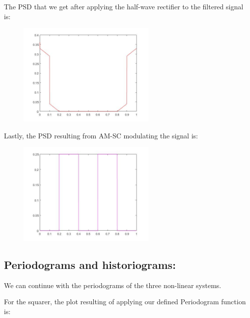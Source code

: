 \documentclass[a4paper,11pt]{article}
\begin{document}
\newpage

The PSD that we get after applying the half-wave rectifier to the filtered signal is:

\begin{figure}[!hp]
    \begin{center}
    \includegraphics[width=0.6\textwidth]{images/lab3_figure9_3.jpg}
    \end{center}
\end{figure}

Lastly, the PSD resulting from AM-SC modulating the signal is:

\begin{figure}[!hp]
    \begin{center}
    \includegraphics[width=0.6\textwidth]{images/lab3_figure9_4.jpg}
    \end{center}
\end{figure}

\newpage

\subsection{Periodograms and historiograms:}

We can continue with the periodograms of the three non-linear systems.

For the squarer, the plot resulting of applying our defined Periodogram function is:
\end{document}
